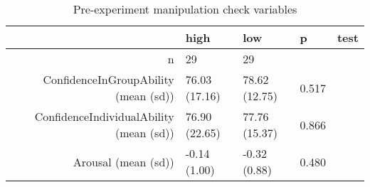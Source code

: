 \begin{table}[ht]
\centering
\begin{tabular}{rllll}
  \hline
 & high & low & p & test \\ 
  \hline
n &    29 &    29 &  &  \\ 
  ConfidenceInGroupAbility (mean (sd)) & 76.03 (17.16) & 78.62 (12.75) &  0.517 &  \\ 
  ConfidenceIndividualAbility (mean (sd)) & 76.90 (22.65) & 77.76 (15.37) &  0.866 &  \\ 
  Arousal (mean (sd)) & -0.14 (1.00) & -0.32 (0.88) &  0.480 &  \\ 
   \hline
\end{tabular}
\caption{Pre-experiment manipulation check variables} 
\label{tab:manipulationCheckTable}
\end{table}
